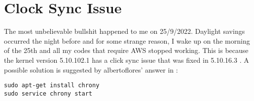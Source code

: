 \section{Clock Sync Issue}
The most unbelievable bullshit happened to me on 25/9/2022. Daylight savings
occurred the night before and for some strange reason, I wake up on the morning
of the 25th and all my codes that require AWS stopped working. This is because
the kernel version 5.10.102.1 has a click sync issue that was fixed in 5.10.16.3
\cite{piouson2020clock}. A possible solution is suggested by albertoflores'
answer in \cite{garyo2021date}:
\begin{lstlisting}
sudo apt-get install chrony
sudo service chrony start
\end{lstlisting}
